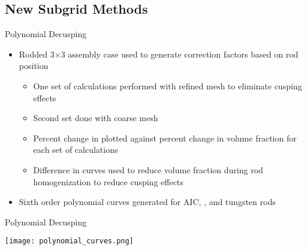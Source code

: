\subsection{New Subgrid Methods}
\begin{frame}[t]{Polynomial Decusping}

\begin{itemize}
    \item Rodded 3$\times$3 assembly case used to generate correction factors based on rod position
    \begin{itemize}
        \item One set of calculations performed with refined mesh to eliminate cusping effects
        \item Second set done with coarse mesh
        \item Percent change in \keff{} plotted against percent change in volume fraction for each set of calculations
        \item Difference in curves used to reduce volume fraction during rod homogenization to reduce cusping effects
    \end{itemize}
    \item Sixth order polynomial curves generated for AIC, \bfc{}, and tungsten rods
\end{itemize}

\end{frame}


\begin{frame}[t]{Polynomial Decusping}
    
\begin{center}
    \texttt{[image: polynomial\_curves.png]}
\end{center}
    
\end{frame}


